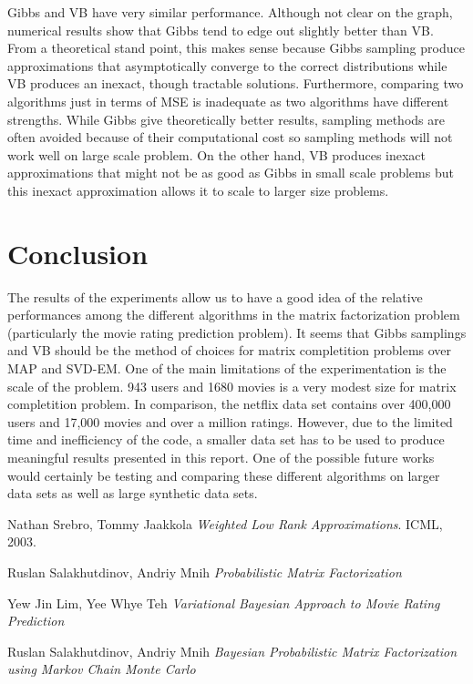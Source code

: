 \documentclass[journal,onecolumn]{IEEEtran}
\begin{document}
Gibbs and VB have very similar performance. Although not clear on the graph, numerical results show that Gibbs tend to edge out slightly better than VB. From a theoretical stand point, this makes sense because Gibbs sampling produce approximations that asymptotically converge to the correct distributions while VB produces an inexact, though tractable solutions. Furthermore, comparing two algorithms just in terms of MSE is inadequate as two algorithms have different strengths. While Gibbs give theoretically better results, sampling methods are often avoided because of their computational cost so sampling methods will not work well on large scale problem. On the other hand, VB produces inexact approximations that might not be as good as Gibbs in small scale problems but this inexact approximation allows it to scale to larger size problems.
 
\section{Conclusion}

The results of the experiments allow us to have a good idea of the relative performances among the different algorithms in the matrix factorization problem (particularly the movie rating prediction problem). It seems that Gibbs samplings and VB should be the method of choices for matrix completition problems over MAP and SVD-EM. One of the main limitations of the experimentation is the scale of the problem. 943 users and 1680 movies is a very modest size for matrix completition problem. In comparison, the netflix data set contains over 400,000 users and 17,000 movies and over a million ratings. However, due to the limited time and inefficiency of the code, a smaller data set has to be used to produce meaningful results presented in this report. One of the possible future works would certainly be testing and comparing these different algorithms on larger data sets as well as large synthetic data sets.

\begin{thebibliography}{}
	Nathan Srebro, Tommy Jaakkola 
	\textit{Weighted Low Rank Approximations}. 
	ICML, 2003.
	
	Ruslan Salakhutdinov, Andriy Mnih 
	\textit{Probabilistic Matrix Factorization}
	
	Yew Jin Lim, Yee Whye Teh 
	\textit{Variational Bayesian Approach to Movie Rating Prediction}

	Ruslan Salakhutdinov, Andriy Mnih 
	\textit{Bayesian Probabilistic Matrix Factorization using Markov Chain Monte Carlo}
\end{thebibliography}
\end{document}
